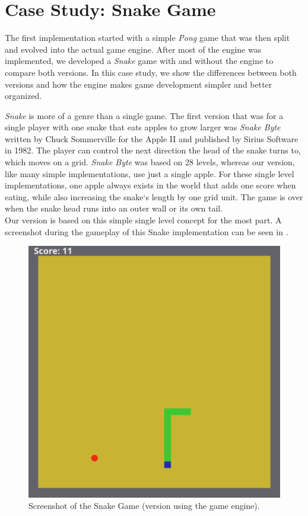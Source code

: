 \chapter{Case Study: Snake Game}\label{chap:casestudy}

The first implementation started with a simple \textit{Pong} game that was then split and evolved into the actual game engine. After most of the engine was implemented, we developed a \textit{Snake} game with and without the engine to compare both versions. In this case study, we show the differences between both versions and how the engine makes game development simpler and better organized.

\textit{Snake} is more of a genre than a single game. The first version that was for a single player with one snake that eats apples to grow larger was \textit{Snake Byte} written by Chuck Sommerville for the Apple II and published by Sirius Software in 1982. The player can control the next direction the head of the snake turns to, which moves on a grid. \textit{Snake Byte} was based on 28 levels, whereas our version, like many simple implementations, use just a single apple. For these single level implementations, one apple always exists in the world that adds one score when eating, while also increasing the snake`s length by one grid unit. The game is over when the snake head runs into an outer wall or its own tail.\\
Our version is based on this simple single level concept for the most part. A screenshot during the gameplay of this Snake implementation can be seen in .

\begin{figure}[h!]
\centering
\includegraphics[width=\linewidth]{img/snake_screenshot.png}
\caption{Screenshot of the Snake Game (version using the game engine).}
\label{fig:snake}
\end{figure}

